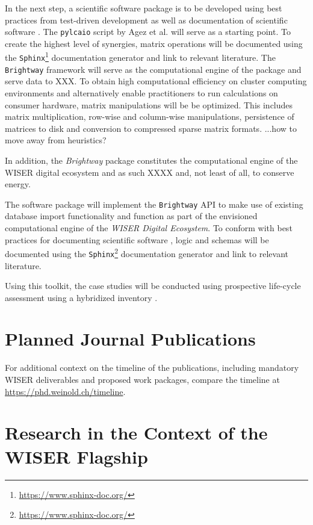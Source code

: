 \documentclass{article}
\begin{document}
    In the next step, a scientific software package is to be developed using best practices from test-driven development \cite{XXX} as well as documentation of scientific software \cite{lee_ten_2018}. The \texttt{pylcaio}\cite{noauthor_pylcaio_2022} script by Agez et al. \cite{agez}\cite{agez} will serve as a starting point. To create the highest level of synergies, matrix operations will be documented using the \texttt{Sphinx}\footnote{\url{https://www.sphinx-doc.org/}} documentation generator and link to relevant literature. The \texttt{Brightway} framework will serve as the computational engine of the package and serve data to XXX. To obtain high computational efficiency on cluster computing environments and alternatively enable practitioners to run calculations on consumer hardware, matrix manipulations will be be optimized. This includes matrix multiplication, row-wise and column-wise manipulations, persistence of matrices to disk and conversion to compressed sparse matrix formats. ...how to move away from heuristics? 
    
    In addition, the \textit{Brightway} package constitutes the computational engine of the WISER digital ecosystem and as such XXXX and, not least of all, to conserve energy.
    
    The software package will implement the \texttt{Brightway} API to make use of existing database import functionality and function as part of the envisioned computational engine of the \textit{WISER Digital Ecosystem}. To conform with best practices for documenting scientific software \cite{lee_ten_2018}, logic and schemas will be documented using the \texttt{Sphinx}\footnote{\url{https://www.sphinx-doc.org/}} documentation generator and link to relevant literature.
    
    Using this toolkit, the case studies will be conducted using prospective \cite{sacchi_prospective_2022} life-cycle assessment using a hybridized inventory \cite{crawford_hybrid_2018}.

\section{Planned Journal Publications}

    For additional context on the timeline of the publications, including mandatory WISER deliverables and proposed work packages, compare the timeline at \url{https://phd.weinold.ch/timeline}.
    
\section{Research in the Context of the WISER Flagship}
    
\end{document}
